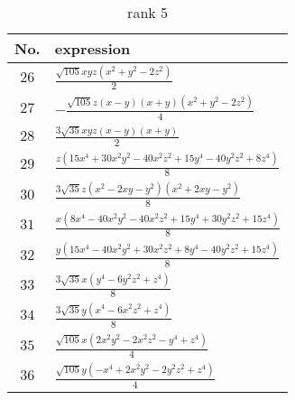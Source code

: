 \documentclass[fleqn,8pt,landscape]{jsarticle}
\begin{document}
\begin{table}[ht!]
\begin{center}
\caption{rank 5}
\renewcommand{\arraystretch}{1.3}
\begin{tabular}{cl} \hline \hline
No. & expression \\ \hline
$ 26 $ & $ \frac{\sqrt{105} x y z \left(x^{2} + y^{2} - 2 z^{2}\right)}{2} $ \\
$ 27 $ & $ - \frac{\sqrt{105} z \left(x - y\right) \left(x + y\right) \left(x^{2} + y^{2} - 2 z^{2}\right)}{4} $ \\
$ 28 $ & $ \frac{3 \sqrt{35} x y z \left(x - y\right) \left(x + y\right)}{2} $ \\
$ 29 $ & $ \frac{z \left(15 x^{4} + 30 x^{2} y^{2} - 40 x^{2} z^{2} + 15 y^{4} - 40 y^{2} z^{2} + 8 z^{4}\right)}{8} $ \\
$ 30 $ & $ \frac{3 \sqrt{35} z \left(x^{2} - 2 x y - y^{2}\right) \left(x^{2} + 2 x y - y^{2}\right)}{8} $ \\
$ 31 $ & $ \frac{x \left(8 x^{4} - 40 x^{2} y^{2} - 40 x^{2} z^{2} + 15 y^{4} + 30 y^{2} z^{2} + 15 z^{4}\right)}{8} $ \\
$ 32 $ & $ \frac{y \left(15 x^{4} - 40 x^{2} y^{2} + 30 x^{2} z^{2} + 8 y^{4} - 40 y^{2} z^{2} + 15 z^{4}\right)}{8} $ \\
$ 33 $ & $ \frac{3 \sqrt{35} x \left(y^{4} - 6 y^{2} z^{2} + z^{4}\right)}{8} $ \\
$ 34 $ & $ \frac{3 \sqrt{35} y \left(x^{4} - 6 x^{2} z^{2} + z^{4}\right)}{8} $ \\
$ 35 $ & $ \frac{\sqrt{105} x \left(2 x^{2} y^{2} - 2 x^{2} z^{2} - y^{4} + z^{4}\right)}{4} $ \\
$ 36 $ & $ \frac{\sqrt{105} y \left(- x^{4} + 2 x^{2} y^{2} - 2 y^{2} z^{2} + z^{4}\right)}{4} $ \\
 \hline \hline
\end{tabular}
\end{center}
\end{table}
\end{document}
